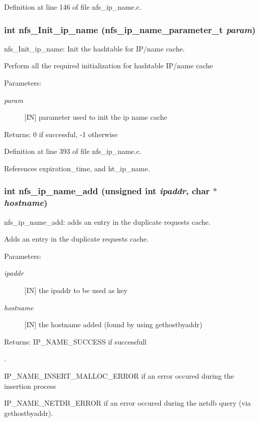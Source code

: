 Definition at line 146 of file nfs\_\-ip\_\-name.c.
\subsubsection{\setlength{\rightskip}{0pt plus 5cm}int nfs\_\-Init\_\-ip\_\-name (nfs\_\-ip\_\-name\_\-parameter\_\-t {\em param})}\label{nfs__ip__name_8c_a11}


nfs\_\-Init\_\-ip\_\-name: Init the hashtable for IP/name cache.

Perform all the required initialization for hashtable IP/name cache

\begin{Desc}
\item[Parameters:]
\begin{description}
\item[{\em param}][IN] parameter used to init the ip name cache\end{description}
\end{Desc}
\begin{Desc}
\item[Returns:]0 if successful, -1 otherwise \end{Desc}


Definition at line 393 of file nfs\_\-ip\_\-name.c.

References expiration\_\-time, and ht\_\-ip\_\-name.
\subsubsection{\setlength{\rightskip}{0pt plus 5cm}int nfs\_\-ip\_\-name\_\-add (unsigned int {\em ipaddr}, char $\ast$ {\em hostname})}\label{nfs__ip__name_8c_a8}


nfs\_\-ip\_\-name\_\-add: adds an entry in the duplicate requests cache.

Adds an entry in the duplicate requests cache.

\begin{Desc}
\item[Parameters:]
\begin{description}
\item[{\em ipaddr}][IN] the ipaddr to be used as key \item[{\em hostname}][IN] the hostname added (found by using gethostbyaddr)\end{description}
\end{Desc}
\begin{Desc}
\item[Returns:]IP\_\-NAME\_\-SUCCESS if successfull\par
. 

IP\_\-NAME\_\-INSERT\_\-MALLOC\_\-ERROR if an error occured during the insertion process \par
 

IP\_\-NAME\_\-NETDB\_\-ERROR if an error occured during the netdb query (via gethostbyaddr). \end{Desc}


